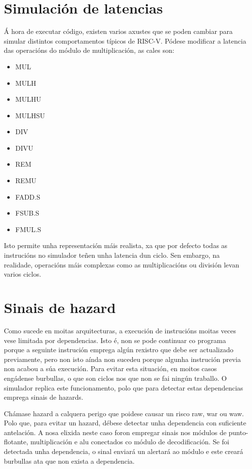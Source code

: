 \section{Simulación de latencias}\label{sec:sim_latencias}
Á hora de executar código, existen varios axustes que se poden cambiar para simular distintos comportamentos típicos de RISC-V. Pódese modificar a latencia  das operacións do módulo de multiplicación, as cales son: 
\begin{itemize}
    \item MUL
    \item MULH
    \item MULHU
    \item MULHSU
    \item DIV
    \item DIVU
    \item REM
    \item REMU
    \item FADD.S
    \item FSUB.S
    \item FMUL.S
\end{itemize}
Isto permite unha representación máis realista, xa que por defecto todas as instrucións no simulador teñen unha latencia dun ciclo. Sen embargo, na realidade, operacións máis complexas como as multiplicacións ou división levan varios ciclos.

\section{Sinais de hazard}\label{sec:hazards}
Como sucede en moitas \gls{arquitecturas}, a execución de instrucións moitas veces vese limitada por dependencias. Isto é, non se pode continuar co programa porque a seguinte instrución emprega algún rexistro que debe ser actualizado previamente, pero non isto aínda non sucedeu porque algunha instrución previa non acabou a súa execución. Para evitar esta situación, en moitos casos engádense burbullas, o que son ciclos nos que non se fai ningún traballo. O simulador replica este funcionamento, polo que para detectar estas dependencias emprega sinais de \gls{hazards}.

Chámase hazard a calquera perigo que poidese causar un risco \acrfull{raw}, \acrfull{war} ou \acrfull{waw}. Polo que, para evitar un hazard, débese detectar unha dependencia con suficiente antelación. A nosa elixida neste caso foron empregar sinais nos módulos de punto-flotante, multiplicación e \acrshort{alu} conectados co módulo de decodificación. Se foi detectada unha dependencia, o sinal enviará un alertará ao módulo e este creará burbullas ata que non exista a dependencia.